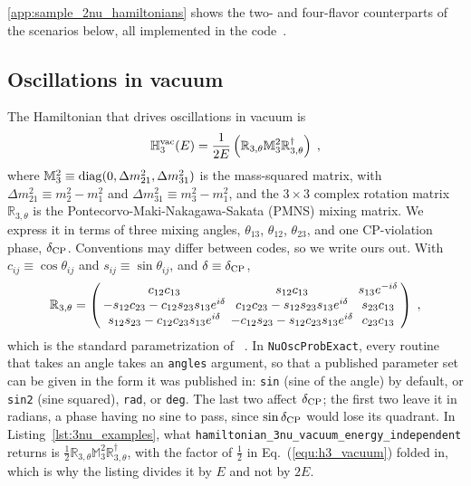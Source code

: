 \documentclass[final,5p,times,twocolumn,sort,compress]{elsarticle}
\newcommand{\eq}{Eq.}
\providecommand{\Ref}{}
\newcommand{\equ}[1]{\eq~(\ref{equ:#1})}
\begin{document}
\ref{app:sample_2nu_hamiltonians} shows the two- and four-flavor counterparts of the scenarios below, all implemented in the code\ \cite{NuOscProbExact}.  


\subsection{Oscillations in vacuum}

The Hamiltonian that drives oscillations in vacuum is
\begin{equation}
 \label{equ:h3_vacuum}
 \mathbb{H}_3^{\rm vac}(E)
 = 
 \frac{1}{2E} \left( \mathbb{R}_{3,\theta} \mathbb{M}_3^2 \mathbb{R}_{3,\theta}^\dagger \right) \;,
\end{equation}
where $\mathbb{M}_3^2 \equiv {\rm diag}(0, \Delta m_{21}^2, \Delta m_{31}^2)$ is the mass-squared matrix, with $\Delta m_{21}^2 \equiv m_2^2-m_1^2$ and $\Delta m_{31}^2 \equiv m_3^2-m_1^2$, and the $3 \times 3$ complex rotation matrix $\mathbb{R}_{3,\theta}$ is the Pontecorvo-Maki-Nakagawa-Sakata (PMNS) mixing matrix.  We express it in terms of three mixing angles, $\theta_{13}$, $\theta_{12}$, $\theta_{23}$, and one CP-violation phase, $\delta_{\rm CP}$.  Conventions may differ between codes, so we write ours out.  With $c_{ij} \equiv \cos\theta_{ij}$ and $s_{ij} \equiv \sin\theta_{ij}$, and $\delta \equiv \delta_{\rm CP}$,
\begin{equation}
 \label{equ:pmns}
 \mathbb{R}_{3,\theta}
 =
 \setlength{\arraycolsep}{2pt}
 \left(
 \begin{array}{ccc}
  c_{12}c_{13} & s_{12}c_{13} & s_{13}e^{-i\delta} \\
  -s_{12}c_{23}-c_{12}s_{23}s_{13}e^{i\delta} & c_{12}c_{23}-s_{12}s_{23}s_{13}e^{i\delta} & s_{23}c_{13} \\
  s_{12}s_{23}-c_{12}c_{23}s_{13}e^{i\delta} & -c_{12}s_{23}-s_{12}c_{23}s_{13}e^{i\delta} & c_{23}c_{13}
 \end{array}
 \right) \;,
\end{equation}
which is the standard parametrization of \Ref\ \cite{Tanabashi:2018oca}.  In {\tt NuOscProbExact}, every routine that takes an angle takes an {\tt angles} argument, so that a published parameter set can be given in the form it was published in: {\tt sin} (sine of the angle) by default, or {\tt sin2} (sine squared), {\tt rad}, or {\tt deg}.  The last two affect $\delta_{\rm CP}$; the first two leave it in radians, a phase having no sine to pass, since $\sin\delta_{\rm CP}$ would lose its quadrant.  In Listing\ \ref{lst:3nu_examples}, what {\tt hamiltonian\_3nu\_vacuum\_energy\_independent} returns is $\tfrac{1}{2} \mathbb{R}_{3,\theta} \mathbb{M}_3^2 \mathbb{R}_{3,\theta}^\dagger$, with the factor of $\tfrac{1}{2}$ in \equ{h3_vacuum} folded in, which is why the listing divides it by $E$ and not by $2E$.
\end{document}
